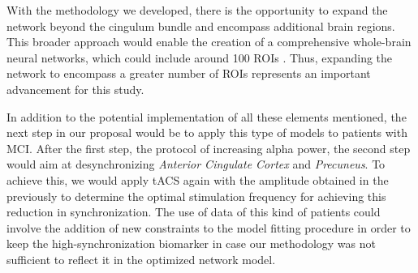 \documentclass[../main.tex]{subfiles}
\begin{document}
With the methodology we developed, there is the opportunity to expand the network beyond the cingulum bundle and encompass additional brain regions.
This broader approach would enable the creation of a comprehensive whole-brain neural networks, 
which could include around 100 ROIs \citep{deco_ongoing_2012,nakagawa_how_2014}.
Thus, expanding the network to encompass a greater number of ROIs represents an important advancement for this study.

In addition to the potential implementation of all these elements mentioned, the next step in our proposal would be to apply this type of models to patients with MCI.
After the first step, the protocol of increasing alpha power, the second step would aim at desynchronizing \textit{Anterior Cingulate Cortex} and \textit{Precuneus}.
To achieve this, we would apply tACS again with the amplitude obtained in the previously to determine
the optimal stimulation frequency for achieving this reduction in synchronization.
The use of data of this kind of patients could involve the addition of new constraints to the model fitting procedure in order to keep the high-synchronization biomarker in case our methodology was not sufficient to reflect it in the optimized network model.
\end{document}
